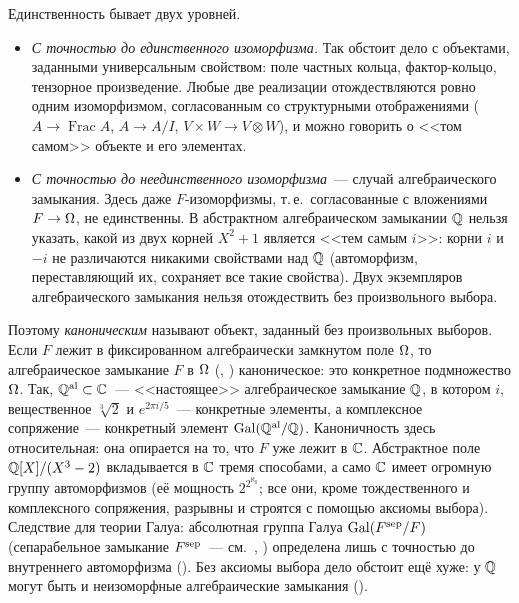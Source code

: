 \begin{aside}
Единственность бывает двух уровней.
\begin{itemize}[leftmargin=*]
\item \emph{С точностью до единственного изоморфизма.} Так обстоит дело с объектами, заданными универсальным
свойством: поле частных кольца, фактор-кольцо, тензорное произведение. Любые две реализации отождествляются ровно одним
изоморфизмом, согласованным со структурными отображениями ($A\to\operatorname{Frac}A$, $A\to A/I$,
$V\times W\to V\otimes W$), и можно говорить о <<том самом>> объекте и его элементах.
\item \emph{С точностью до неединственного изоморфизма}~--- случай алгебраического замыкания. Здесь даже
$F$-изоморфизмы, т.\,е.\ согласованные с вложениями $F\to\Omega$, не единственны. В абстрактном алгебраическом замыкании
$\mathbb Q$ нельзя указать, какой из двух корней $X^2+1$ является <<тем самым $i$>>: корни $i$ и $-i$ не различаются никакими
свойствами над $\mathbb Q$ (автоморфизм, переставляющий их, сохраняет все такие свойства). Двух экземпляров алгебраического
замыкания нельзя отождествить без произвольного выбора.
\end{itemize}
Поэтому \emph{каноническим} называют объект, заданный без произвольных выборов. Если $F$ лежит в фиксированном
алгебраически замкнутом поле $\Omega$, то алгебраическое замыкание $F$ в $\Omega$ (, ) каноническое: это конкретное
подмножество $\Omega$. Так, $\mathbb Q^{\mathrm{al}}\subset\mathbb C$~--- <<настоящее>> алгебраическое замыкание $\mathbb Q$, в котором $i$, вещественное
$\sqrt[3]2$ и $e^{2\pi i/5}$~--- конкретные элементы, а комплексное сопряжение~--- конкретный элемент
$\operatorname{Gal}(\mathbb Q^{\mathrm{al}}/\mathbb Q)$. Каноничность здесь относительная: она опирается на то, что $F$ уже лежит в $\mathbb C$. Абстрактное поле
$\mathbb Q[X]/(X^3-2)$ вкладывается в $\mathbb C$ тремя способами, а само $\mathbb C$ имеет огромную группу автоморфизмов (её мощность
$2^{2^{\aleph_0}}$; все они, кроме тождественного и комплексного сопряжения, разрывны и строятся с помощью аксиомы
выбора). Следствие для теории Галуа: абсолютная группа
Галуа $\operatorname{Gal}(F^{\mathrm{sep}}/F)$ (сепарабельное замыкание $F^{\mathrm{sep}}$~--- см.~, ) определена лишь с точностью до внутреннего автоморфизма (). Без аксиомы выбора дело обстоит
ещё хуже: у $\mathbb Q$ могут быть и неизоморфные алгебраические замыкания ().
\end{aside}
